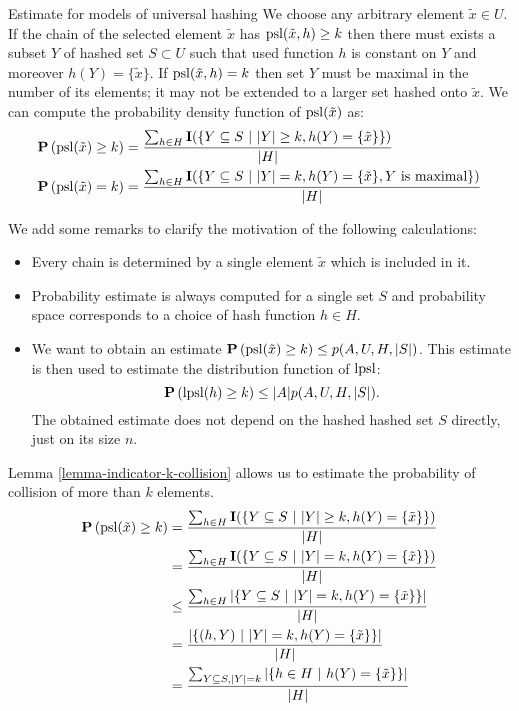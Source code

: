 \begin{section}{Estimate for models of universal hashing}
We choose any arbitrary element $\tilde{x} \in U$. If the chain of the selected element $\tilde{x}$ has $\mathrm{psl}(\tilde{x}, h) \geq k$ then there must exists a subset $Y$ of hashed set $S \subset U$ such that used function $h$ is constant on $Y$ and moreover $h(Y) = \{ \tilde{x} \}$. If $\mathrm{psl}(\tilde{x}, h) = k$ then set $Y$ must be maximal in the number of its elements; it may not be extended to a larger set hashed onto $\tilde{x}$. We can compute the probability density function of $\mathrm{psl}(\tilde{x})$ as:
\begin{displaymath}
\begin{split}
\mathbf{P}\left(\mathrm{psl}(\tilde{x}) \geq k\right) & = \frac{\sum\displaylimits_{h \in H} \mathbf{I}(\{ Y \subseteq S \ | \  |Y| \geq k, h(Y) = \{ \tilde{x} \} \})}{|H|} \\
\mathbf{P}\left(\mathrm{psl}(\tilde{x}) = k\right) & = \frac{\sum\displaylimits_{h \in H} \mathbf{I}(\{ Y \subseteq S \ | \  |Y| = k, h(Y) = \{ \tilde{x} \}, Y \text{ is maximal} \})}{|H|} \\
\end{split}
\end{displaymath}

We add some remarks to clarify the motivation of the following calculations:
\begin{itemize}
\item Every chain is determined by a single element $\tilde{x}$ which is included in it.
\item Probability estimate is always computed for a single set $S$ and probability space corresponds to a choice of hash function $h \in H$.
\item We want to obtain an estimate $\mathbf{P}\left(\mathrm{psl}(\tilde{x}) \geq k\right) \leq p(A, U, H, |S|)$. This estimate is then used to estimate the distribution function of $\mathrm{lpsl}$: \[ \mathbf{P}\left(\mathrm{lpsl}(h) \geq k\right) \leq |A| p(A, U, H, |S|) \text{.} \] The obtained estimate does not depend on the hashed hashed set $S$ directly, just on its size $n$.
\end{itemize}

Lemma \ref{lemma-indicator-k-collision} allows us to estimate the probability of collision of more than $k$ elements.
\begin{displaymath}
\begin{split}
\mathbf{P}\left(\mathrm{psl}(\tilde{x}) \geq k\right)
	& = \frac{\sum\displaylimits_{h \in H} \mathbf{I}(\{ Y \subseteq S \ | \  |Y| \geq k, h(Y) = \{ \tilde{x} \} \})}{|H|} \\
	& = \frac{\sum\displaylimits_{h \in H} \mathbf{I}(\{ Y \subseteq S \ | \  |Y| = k, h(Y) = \{ \tilde{x} \} \})}{|H|} \\
	& \leq \frac{\sum\displaylimits_{h \in H} |\{ Y \subseteq S \ | \  |Y| = k, h(Y) = \{ \tilde{x} \} \}|}{|H|} \\
	& = \frac{|\{ (h, Y) \ | \  |Y| = k, h(Y) = \{ \tilde{x} \} \}|}{|H|} \\
	& = \frac{\sum\displaylimits_{Y \subseteq S, |Y| = k} | \{ h \in H \ | \  h(Y) = \{\tilde{x}\} \}|}{|H|} \\
\end{split}
\end{displaymath}


\end{section}
